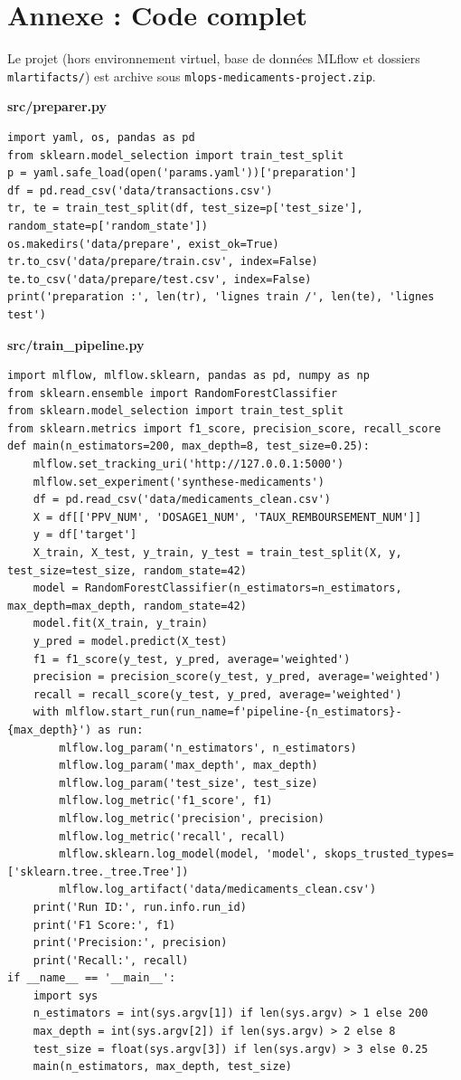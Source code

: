 \documentclass[12pt,a4paper]{report}
\begin{document}
\chapter*{Annexe : Code complet}
Le projet (hors environnement virtuel, base de données MLflow et dossiers \texttt{mlartifacts/}) est archive sous \texttt{mlops-medicaments-project.zip}.

\textbf{src/preparer.py}
\begin{verbatim}
import yaml, os, pandas as pd
from sklearn.model_selection import train_test_split
p = yaml.safe_load(open('params.yaml'))['preparation']
df = pd.read_csv('data/transactions.csv')
tr, te = train_test_split(df, test_size=p['test_size'], random_state=p['random_state'])
os.makedirs('data/prepare', exist_ok=True)
tr.to_csv('data/prepare/train.csv', index=False)
te.to_csv('data/prepare/test.csv', index=False)
print('preparation :', len(tr), 'lignes train /', len(te), 'lignes test')
\end{verbatim}

\textbf{src/train\_pipeline.py}
\begin{verbatim}
import mlflow, mlflow.sklearn, pandas as pd, numpy as np
from sklearn.ensemble import RandomForestClassifier
from sklearn.model_selection import train_test_split
from sklearn.metrics import f1_score, precision_score, recall_score
def main(n_estimators=200, max_depth=8, test_size=0.25):
    mlflow.set_tracking_uri('http://127.0.0.1:5000')
    mlflow.set_experiment('synthese-medicaments')
    df = pd.read_csv('data/medicaments_clean.csv')
    X = df[['PPV_NUM', 'DOSAGE1_NUM', 'TAUX_REMBOURSEMENT_NUM']]
    y = df['target']
    X_train, X_test, y_train, y_test = train_test_split(X, y, test_size=test_size, random_state=42)
    model = RandomForestClassifier(n_estimators=n_estimators, max_depth=max_depth, random_state=42)
    model.fit(X_train, y_train)
    y_pred = model.predict(X_test)
    f1 = f1_score(y_test, y_pred, average='weighted')
    precision = precision_score(y_test, y_pred, average='weighted')
    recall = recall_score(y_test, y_pred, average='weighted')
    with mlflow.start_run(run_name=f'pipeline-{n_estimators}-{max_depth}') as run:
        mlflow.log_param('n_estimators', n_estimators)
        mlflow.log_param('max_depth', max_depth)
        mlflow.log_param('test_size', test_size)
        mlflow.log_metric('f1_score', f1)
        mlflow.log_metric('precision', precision)
        mlflow.log_metric('recall', recall)
        mlflow.sklearn.log_model(model, 'model', skops_trusted_types=['sklearn.tree._tree.Tree'])
        mlflow.log_artifact('data/medicaments_clean.csv')
    print('Run ID:', run.info.run_id)
    print('F1 Score:', f1)
    print('Precision:', precision)
    print('Recall:', recall)
if __name__ == '__main__':
    import sys
    n_estimators = int(sys.argv[1]) if len(sys.argv) > 1 else 200
    max_depth = int(sys.argv[2]) if len(sys.argv) > 2 else 8
    test_size = float(sys.argv[3]) if len(sys.argv) > 3 else 0.25
    main(n_estimators, max_depth, test_size)
\end{verbatim}
\end{document}
